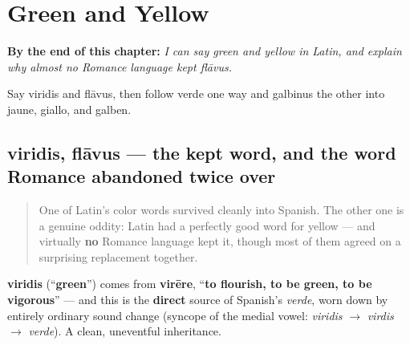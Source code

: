 
\chapter{Green and Yellow}
\label{ch:la-green-and-yellow}

\begin{chapteropening}
\textbf{By the end of this chapter:} \emph{I can say green and yellow in Latin, and explain why almost no Romance language kept flāvus.}

Say viridis and flāvus, then follow verde one way and galbinus the other into jaune, giallo, and galben.
\end{chapteropening}

\section[viridis, flāvus]{viridis, flāvus — the kept word, and the word Romance abandoned twice over}

\label{lesson:LA-C18-viridis-flavus}



\begin{quote}
One of Latin's color words survived cleanly into Spanish. The other one is a genuine oddity: Latin had a perfectly good word for yellow — and virtually \textbf{no} Romance language kept it, though most of them agreed on a surprising replacement together.
\end{quote}

\begin{cousinweb}
\textbf{viridis} (\textquotedblleft{}\textbf{green}\textquotedblright{}) comes from \textbf{virēre}, \textquotedblleft{}\textbf{to flourish, to be green, to be vigorous}\textquotedblright{} — and this is the \textbf{direct} source of Spanish's \emph{verde}, worn down by entirely ordinary sound change (syncope of the medial vowel: \emph{viridis} $\to$ \emph{virdis} $\to$ \emph{verde}). A clean, uneventful inheritance.
\end{cousinweb}

